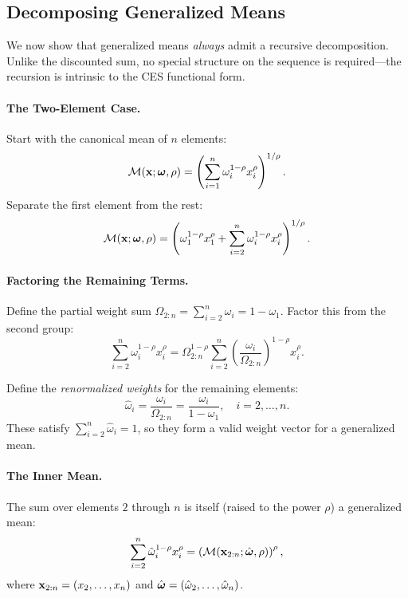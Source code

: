 \subsection{Decomposing Generalized Means}
\label{subsec:decomposing-means}

We now show that generalized means \emph{always} admit a recursive decomposition. Unlike the discounted sum, no special structure on the sequence is required---the recursion is intrinsic to the CES functional form.

\paragraph{The Two-Element Case.}
Start with the canonical mean of $n$ elements:
\begin{equation}
\mathcal{M}(\mathbf{x}; \boldsymbol{\omega}, \rho) = \left( \sum_{i=1}^{n} \omega_i^{1-\rho} x_i^\rho \right)^{1/\rho}.
\label{eq:n-element-mean}
\end{equation}
Separate the first element from the rest:
\begin{equation}
\mathcal{M}(\mathbf{x}; \boldsymbol{\omega}, \rho) = \left( \omega_1^{1-\rho} x_1^\rho + \sum_{i=2}^{n} \omega_i^{1-\rho} x_i^\rho \right)^{1/\rho}.
\label{eq:separate-first}
\end{equation}

\paragraph{Factoring the Remaining Terms.}
Define the partial weight sum $\Omega_{2:n} = \sum_{i=2}^{n} \omega_i = 1 - \omega_1$. Factor this from the second group:
\begin{equation}
\sum_{i=2}^{n} \omega_i^{1-\rho} x_i^\rho = \Omega_{2:n}^{1-\rho} \sum_{i=2}^{n} \left(\frac{\omega_i}{\Omega_{2:n}}\right)^{1-\rho} x_i^\rho.
\label{eq:factor-remaining}
\end{equation}

Define the \emph{renormalized weights} for the remaining elements:
\begin{equation}
\hat{\omega}_i = \frac{\omega_i}{\Omega_{2:n}} = \frac{\omega_i}{1 - \omega_1}, \quad i = 2, \ldots, n.
\label{eq:renormalized-weights}
\end{equation}
These satisfy $\sum_{i=2}^{n} \hat{\omega}_i = 1$, so they form a valid weight vector for a generalized mean.

\paragraph{The Inner Mean.}
The sum over elements $2$ through $n$ is itself (raised to the power $\rho$) a generalized mean:
\begin{equation}
\sum_{i=2}^{n} \hat{\omega}_i^{1-\rho} x_i^\rho = \left( \mathcal{M}(\mathbf{x}_{2:n}; \hat{\boldsymbol{\omega}}, \rho) \right)^\rho,
\label{eq:inner-mean}
\end{equation}
where $\mathbf{x}_{2:n} = (x_2, \ldots, x_n)$ and $\hat{\boldsymbol{\omega}} = (\hat{\omega}_2, \ldots, \hat{\omega}_n)$.

